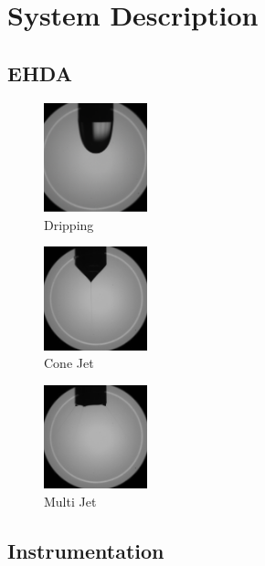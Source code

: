 \chapter[System Description]{System Description}
\label{chap:descricaoproblema}


\section{EHDA}
\label{sec:ehda_resume}


\begin{multicols}{3}

  \begin{figure}[H]
      \center
      \includegraphics[width=3cm]{systemDescription/Figuras/drippingexample.png}
      \caption{Dripping}
  \end{figure}


  \begin{figure}[H]
      \center
      \includegraphics[width=3cm]{systemDescription/Figuras/conejetexample.png}
      \caption{Cone Jet}
  \end{figure}


  \begin{figure}[H]
      \center
      \includegraphics[width=3cm]{systemDescription/Figuras/multijetexample.png}
      \caption{Multi Jet}
  \end{figure}

\end{multicols}


\section{Instrumentation}
\label{sec:instrumentation}


